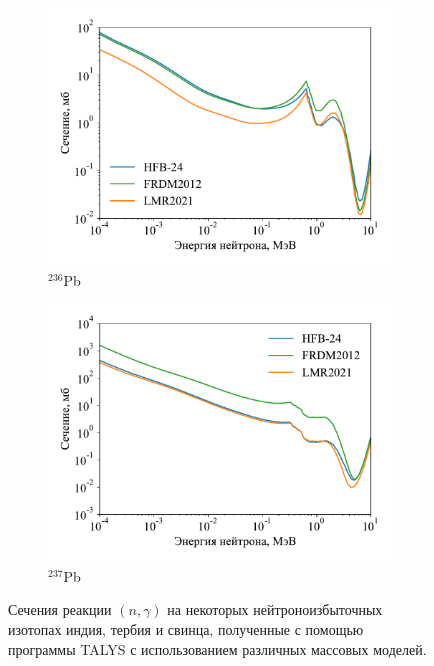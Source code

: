\begin{figure}
\begin{subfigure}{0.48\textwidth}
    \includegraphics[width=\textwidth]{../pics/cs_pb236.pdf}
    \caption{${}^{236}$Pb}
    \label{fig:ng_cs:236pb}
  \end{subfigure}
  \hfil
  \begin{subfigure}{0.48\textwidth}
    \centering
    \includegraphics[width=\textwidth]{../pics/cs_pb237.pdf}
    \caption{${}^{237}$Pb}
    \label{fig:ng_cs:237pb}
  \end{subfigure}
  \caption{Сечения реакции $(n,\gamma)$ на некоторых нейтроноизбыточных изотопах индия, тербия и свинца, полученные с помощью программы TALYS с использованием различных массовых моделей.}
  \label{fig:ng_cs}
\end{figure}

